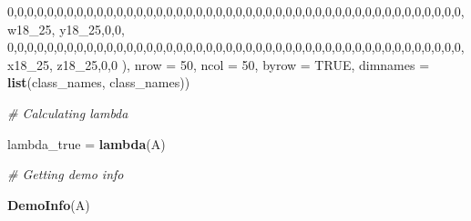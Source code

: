 \documentclass[]{article}
\newenvironment{Shaded}{\begin{snugshade}}{\end{snugshade}}
\newcommand{\CommentTok}[1]{\textcolor[rgb]{0.56,0.35,0.01}{\textit{#1}}}
\newcommand{\DataTypeTok}[1]{\textcolor[rgb]{0.13,0.29,0.53}{#1}}
\newcommand{\DecValTok}[1]{\textcolor[rgb]{0.00,0.00,0.81}{#1}}
\newcommand{\KeywordTok}[1]{\textcolor[rgb]{0.13,0.29,0.53}{\textbf{#1}}}
\newcommand{\NormalTok}[1]{#1}
\newcommand{\OtherTok}[1]{\textcolor[rgb]{0.56,0.35,0.01}{#1}}
\newcommand{\StringTok}[1]{\textcolor[rgb]{0.31,0.60,0.02}{#1}}
\begin{document}
\begin{Shaded}
\begin{Highlighting}[]
\DecValTok{0}\NormalTok{,}\DecValTok{0}\NormalTok{,}\DecValTok{0}\NormalTok{,}\DecValTok{0}\NormalTok{,}\DecValTok{0}\NormalTok{,}\DecValTok{0}\NormalTok{,}\DecValTok{0}\NormalTok{,}\DecValTok{0}\NormalTok{,}\DecValTok{0}\NormalTok{,}\DecValTok{0}\NormalTok{,}\DecValTok{0}\NormalTok{,}\DecValTok{0}\NormalTok{,}\DecValTok{0}\NormalTok{,}\DecValTok{0}\NormalTok{,}\DecValTok{0}\NormalTok{,}\DecValTok{0}\NormalTok{,}\DecValTok{0}\NormalTok{,}\DecValTok{0}\NormalTok{,}\DecValTok{0}\NormalTok{,}\DecValTok{0}\NormalTok{,}\DecValTok{0}\NormalTok{,}\DecValTok{0}\NormalTok{,}\DecValTok{0}\NormalTok{,}\DecValTok{0}\NormalTok{,}\DecValTok{0}\NormalTok{,}\DecValTok{0}\NormalTok{,}\DecValTok{0}\NormalTok{,}\DecValTok{0}\NormalTok{,}\DecValTok{0}\NormalTok{,}\DecValTok{0}\NormalTok{,}\DecValTok{0}\NormalTok{,}\DecValTok{0}\NormalTok{,}\DecValTok{0}\NormalTok{,}\DecValTok{0}\NormalTok{,}\DecValTok{0}\NormalTok{,}\DecValTok{0}\NormalTok{,}\DecValTok{0}\NormalTok{,}\DecValTok{0}\NormalTok{,}\DecValTok{0}\NormalTok{,}\DecValTok{0}\NormalTok{,}\DecValTok{0}\NormalTok{,}\DecValTok{0}\NormalTok{,}\DecValTok{0}\NormalTok{,}\DecValTok{0}\NormalTok{,}\DecValTok{0}\NormalTok{,}\DecValTok{0}\NormalTok{,w18_}\DecValTok{25}\NormalTok{, y18_}\DecValTok{25}\NormalTok{,}\DecValTok{0}\NormalTok{,}\DecValTok{0}\NormalTok{,}
\DecValTok{0}\NormalTok{,}\DecValTok{0}\NormalTok{,}\DecValTok{0}\NormalTok{,}\DecValTok{0}\NormalTok{,}\DecValTok{0}\NormalTok{,}\DecValTok{0}\NormalTok{,}\DecValTok{0}\NormalTok{,}\DecValTok{0}\NormalTok{,}\DecValTok{0}\NormalTok{,}\DecValTok{0}\NormalTok{,}\DecValTok{0}\NormalTok{,}\DecValTok{0}\NormalTok{,}\DecValTok{0}\NormalTok{,}\DecValTok{0}\NormalTok{,}\DecValTok{0}\NormalTok{,}\DecValTok{0}\NormalTok{,}\DecValTok{0}\NormalTok{,}\DecValTok{0}\NormalTok{,}\DecValTok{0}\NormalTok{,}\DecValTok{0}\NormalTok{,}\DecValTok{0}\NormalTok{,}\DecValTok{0}\NormalTok{,}\DecValTok{0}\NormalTok{,}\DecValTok{0}\NormalTok{,}\DecValTok{0}\NormalTok{,}\DecValTok{0}\NormalTok{,}\DecValTok{0}\NormalTok{,}\DecValTok{0}\NormalTok{,}\DecValTok{0}\NormalTok{,}\DecValTok{0}\NormalTok{,}\DecValTok{0}\NormalTok{,}\DecValTok{0}\NormalTok{,}\DecValTok{0}\NormalTok{,}\DecValTok{0}\NormalTok{,}\DecValTok{0}\NormalTok{,}\DecValTok{0}\NormalTok{,}\DecValTok{0}\NormalTok{,}\DecValTok{0}\NormalTok{,}\DecValTok{0}\NormalTok{,}\DecValTok{0}\NormalTok{,}\DecValTok{0}\NormalTok{,}\DecValTok{0}\NormalTok{,}\DecValTok{0}\NormalTok{,}\DecValTok{0}\NormalTok{,}\DecValTok{0}\NormalTok{,}\DecValTok{0}\NormalTok{,x18_}\DecValTok{25}\NormalTok{, z18_}\DecValTok{25}\NormalTok{,}\DecValTok{0}\NormalTok{,}\DecValTok{0}
\NormalTok{),  }
\DataTypeTok{nrow =} \DecValTok{50}\NormalTok{, }\DataTypeTok{ncol =} \DecValTok{50}\NormalTok{, }\DataTypeTok{byrow =} \OtherTok{TRUE}\NormalTok{, }\DataTypeTok{dimnames =} \KeywordTok{list}\NormalTok{(class_names, class_names))}


\CommentTok{# Calculating lambda}

\NormalTok{lambda_true =}\StringTok{ }\KeywordTok{lambda}\NormalTok{(A)}

\CommentTok{# Getting demo info}

\KeywordTok{DemoInfo}\NormalTok{(A)}
\end{Highlighting}
\end{Shaded}
\end{document}
